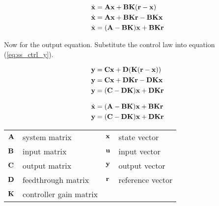 \begin{align}
  \dot{\mathbf{x}} &= \mathbf{A}\mathbf{x} + \mathbf{B}\mathbf{K}(\mathbf{r} - \mathbf{x}) \nonumber
    \\
  \dot{\mathbf{x}} &= \mathbf{A}\mathbf{x} + \mathbf{B}\mathbf{K}\mathbf{r} -
    \mathbf{B}\mathbf{K}\mathbf{x} \nonumber \\
  \dot{\mathbf{x}} &= (\mathbf{A} - \mathbf{B}\mathbf{K})\mathbf{x} + \mathbf{B}\mathbf{K}\mathbf{r}
\end{align}

Now for the output equation. Substitute the control law into equation
(\ref{eq:ss_ctrl_y}).

\begin{align}
  \mathbf{y} &= \mathbf{C}\mathbf{x} + \mathbf{D}(\mathbf{K}(\mathbf{r} - \mathbf{x})) \nonumber \\
  \mathbf{y} &= \mathbf{C}\mathbf{x} + \mathbf{D}\mathbf{K}\mathbf{r} - \mathbf{D}\mathbf{K}\mathbf{x}
    \nonumber \\
  \mathbf{y} &= (\mathbf{C} - \mathbf{D}\mathbf{K})\mathbf{x} + \mathbf{D}\mathbf{K}\mathbf{r}
\end{align}

\begin{theorem}
  \begin{align}
    \dot{\mathbf{x}} &= (\mathbf{A} - \mathbf{B}\mathbf{K})\mathbf{x} + \mathbf{B}\mathbf{K}\mathbf{r}
      \label{eq:s_ref_ctrl_x} \\
    \mathbf{y} &= (\mathbf{C} - \mathbf{D}\mathbf{K})\mathbf{x} + \mathbf{D}\mathbf{K}\mathbf{r}
      \label{eq:s_ref_ctrl_y}
  \end{align}

  \begin{figurekey}
    \begin{tabulary}{\linewidth}{LLLL}
      $\mathbf{A}$ & system matrix      & $\mathbf{x}$ & state vector \\
      $\mathbf{B}$ & input matrix       & $\mathbf{u}$ & input vector \\
      $\mathbf{C}$ & output matrix      & $\mathbf{y}$ & output vector \\
      $\mathbf{D}$ & feedthrough matrix & $\mathbf{r}$ & \gls{reference} vector \\
      $\mathbf{K}$ & controller gain matrix &  &  \\
    \end{tabulary}
  \end{figurekey}
\end{theorem}

